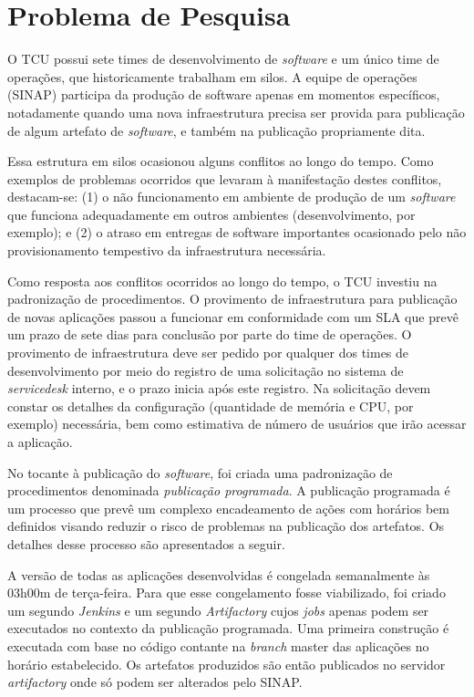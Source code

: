 \section{Problema de Pesquisa}%
O \acrshort{TCU} possui sete times de desenvolvimento de \textit{software} e um
único time de operações, que historicamente trabalham em silos.
A equipe de operações (\acrfull{SINAP}) participa da produção de software apenas
em momentos específicos, notadamente quando uma nova infraestrutura precisa ser
provida para publicação de algum artefato de \textit{software}, e também na
publicação propriamente dita.

Essa estrutura em silos ocasionou alguns conflitos ao longo do tempo. Como
exemplos de problemas ocorridos que levaram à manifestação
destes conflitos, destacam-se: (1) o não
funcionamento em ambiente de produção de um \textit{software} que funciona adequadamente
em outros ambientes (desenvolvimento, por exemplo); e (2) o atraso em entregas
de software importantes ocasionado pelo não provisionamento tempestivo da
infraestrutura necessária.

Como resposta aos conflitos ocorridos ao longo do tempo, o \acrshort{TCU}
investiu na padronização de procedimentos. O provimento de infraestrutura
para publicação de novas aplicações passou a funcionar em conformidade com um
\acrfull{SLA} que prevê um prazo de sete dias para conclusão por parte do time
de operações. O provimento de infraestrutura deve ser pedido por qualquer
dos times de desenvolvimento por meio do registro de uma solicitação no sistema
de \textit{servicedesk} interno, e o prazo inicia após este registro.
Na solicitação devem constar os detalhes da configuração (quantidade de memória
e CPU, por exemplo) necessária, bem como estimativa de número de usuários que
irão acessar a aplicação.

No tocante à publicação do \textit{software}, foi criada uma padronização de
procedimentos denominada \emph{publicação programada}. A publicação programada
é um processo que prevê um complexo encadeamento de ações com horários bem
definidos visando reduzir o risco de problemas na publicação dos artefatos. Os
detalhes desse processo são apresentados a seguir.

A versão de todas as aplicações desenvolvidas é congelada semanalmente
às 03h00m de terça-feira. Para que esse congelamento fosse viabilizado, foi
criado um segundo \textit{Jenkins} e um segundo \textit{Artifactory} cujos
\textit{jobs} apenas podem ser executados no contexto da publicação programada.
Uma primeira construção é executada com base no código contante
na \textit{branch} master das aplicações no horário estabelecido. Os artefatos
produzidos são então publicados no servidor \textit{artifactory} onde só podem
ser alterados pelo \acrshort{SINAP}.

